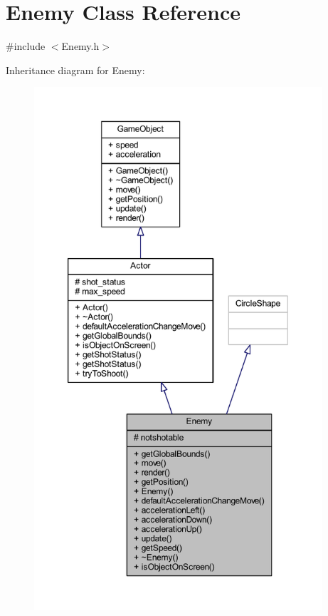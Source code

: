 \hypertarget{class_enemy}{}\section{Enemy Class Reference}
\label{class_enemy}


{\ttfamily \#include $<$Enemy.\+h$>$}



Inheritance diagram for Enemy\+:
\nopagebreak
\begin{figure}[H]
\begin{center}
\leavevmode
\includegraphics[height=550pt]{class_enemy__inherit__graph}
\end{center}
\end{figure}


